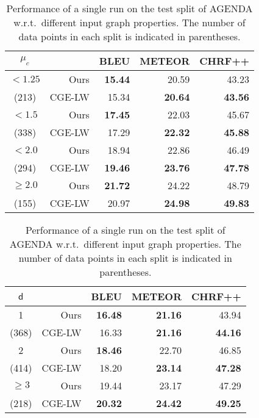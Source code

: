 \documentclass[11pt]{article}
\begin{document}
\begin{table}[t]
	\centering
	\small
	\begin{subtable}{\linewidth}
		\centering
		\small
		\begin{tabular}{crrrr}
			\toprule
			$\mu_c$&& BLEU & METEOR & CHRF++ \\
			\midrule
			${} < 1.25$ & Ours & \textbf{15.44} & 20.59 & 43.23 \\
			(213) & CGE-LW & 15.34 & \textbf{20.64} & \textbf{43.56} \\
			\midrule
			${} < 1.5$ & Ours & \textbf{17.45} & 22.03 & 45.67 \\
			(338) & CGE-LW & 17.29 & \textbf{22.32} & \textbf{45.88} \\
			\midrule
			${} < 2.0$ & Ours & 18.94 & 22.86 & 46.49 \\
			(294) & CGE-LW & \textbf{19.46} & \textbf{23.76} & \textbf{47.78} \\
			\midrule
			${}\geq 2.0$ & Ours & \textbf{21.72} & 24.22 & 48.79 \\
			(155) & CGE-LW & 20.97 & \textbf{24.98} & \textbf{49.83} \\
			\bottomrule
		\end{tabular}
		\caption{Average size $\mu_c$ of graph components.}
		\label{tab:compsize}
	\end{subtable}
	
	\vspace{.5em}
	\begin{subtable}{\linewidth}
		\centering
		\small
		\begin{tabular}{crrrr}
			\toprule
			$\mathsf{d}$&& BLEU & METEOR & CHRF++ \\
			\midrule
			1 & Ours & \textbf{16.48} & \textbf{21.16} & 43.94 \\
			(368) & CGE-LW & 16.33 & \textbf{21.16} & \textbf{44.16} \\
			\midrule
			2 & Ours & \textbf{18.46} & 22.70 & 46.85 \\
			(414) & CGE-LW & 18.20 & \textbf{23.14} & \textbf{47.28} \\
			\midrule
			${}\geq 3$ & Ours & 19.44 & 23.17 & 47.29 \\
			(218) & CGE-LW & \textbf{20.32} & \textbf{24.42} & \textbf{49.25} \\
			\bottomrule
		\end{tabular}
		\label{tab:diameter}
	\end{subtable}
	\caption{Performance of a single run on the test split of AGENDA w.r.t.\ different input graph properties. The number of data points in each split is indicated in parentheses.}
	\label{tab:analysis}
\end{table}
\end{document}
